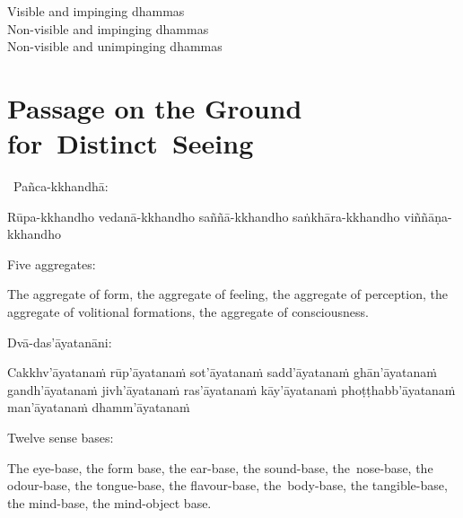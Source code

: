 \begin{english-verses}
  Visible and impinging dhammas\\
  Non-visible and impinging dhammas\\
  Non-visible and unimpinging dhammas
\end{english-verses}

\suttaRef{[Dhs 1]}



\section{Passage on the Ground \mbox{for}~Distinct~Seeing}
\label{passage-on-ground-for-distinct-seeing}

\begin{pali-hang-continued}
  \anglebracketleft\ \hspace{-0.5mm}Pañca-kkhandhā: \hspace{-0.5mm}\anglebracketright\
  \begin{pali-hang}
    Rūpa-kkhandho vedanā-kkhandho saññā-kkhandho saṅkhāra-kkhandho viññāṇa-kkhandho
  \end{pali-hang}
\end{pali-hang-continued}

\begin{english-verses}
  Five aggregates:
  \begin{english-hang-together-verses}
    The aggregate of form, the aggregate of feeling, the aggregate of perception, the aggregate of volitional formations, the aggregate of consciousness.
  \end{english-hang-together-verses}
\end{english-verses}

\suttaRef{[DN 33]}

\begin{pali-hang-continued}
  Dvā-das'āyatanāni:
  \begin{pali-hang}
    Cakkhv'āyatanaṁ rūp'āyatanaṁ sot'āyatanaṁ sadd'āyatanaṁ ghān'āyatanaṁ gandh'āyatanaṁ jivh'āyatanaṁ ras'āyatanaṁ kāy'āyatanaṁ phoṭṭhabb'āyatanaṁ man'āyatanaṁ dhamm'āyatanaṁ
  \end{pali-hang}
\end{pali-hang-continued}

\begin{english-verses}
  Twelve sense bases:
  \begin{english-hang-together-verses}
    The eye-base, the form base, the ear-base, the sound-base, the~nose-base, the odour-base, the tongue-base, the flavour-base, the~body-base, the tangible-base, the mind-base, the mind-object base.
  \end{english-hang-together-verses}
\end{english-verses}

